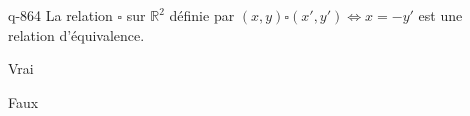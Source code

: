 \begin{truefalse}{q-864}
La relation $\square$ sur $\mathbb R^2$ définie par $(x,y)\square (x',y') \iff x=-y'$ est une relation d'équivalence.
\item Vrai
\item* Faux
\end{truefalse}

